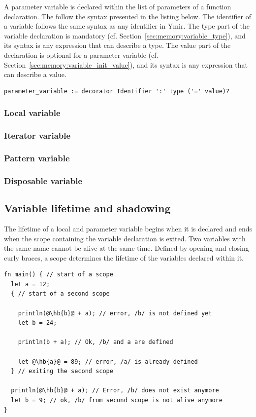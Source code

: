 A parameter variable is declared within the list of parameters of a function
declaration. The follow the syntax presented in the listing below. The
identifier of a variable follows the same syntax as any identifier in Ymir. The
type part of the variable declaration is mandatory (cf.
Section~\ref{sec:memory:variable_type}), and its syntax is any expression that can
describe a type. The value part of the declaration is optional for a parameter
variable (cf. Section~\ref{sec:memory:variable_init_value}), and its syntax is any
expression that can describe a value.

\begin{lstlisting}[style=grammarVerb]
parameter_variable := decorator Identifier ':' type ('=' value)?
\end{lstlisting}

\subsubsection*{Local variable}
\subsubsection*{Iterator variable}
\subsubsection*{Pattern variable}
\subsubsection*{Disposable variable}

\subsection{Variable lifetime and shadowing}

The lifetime of a local and parameter variable begins when it is declared and
ends when the scope containing the variable declaration is exited. Two variables
with the same name cannot be alive at the same time. Defined by opening and
closing curly braces, a scope determines the lifetime of the variables declared
within it.

\begin{lstlisting}[style=coloredverbatimError, escapechar=@]
fn main() { // start of a scope
  let a = 12;
  { // start of a second scope

    println(@\hb{b}@ + a); // error, /b/ is not defined yet
    let b = 24;

    println(b + a); // Ok, /b/ and a are defined

    let @\hb{a}@ = 89; // error, /a/ is already defined
  } // exiting the second scope

  println(@\hb{b}@ + a); // Error, /b/ does not exist anymore
  let b = 9; // ok, /b/ from second scope is not alive anymore
}
\end{lstlisting}

